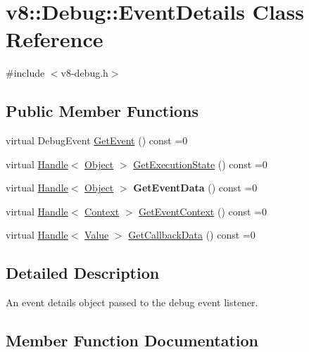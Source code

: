 \hypertarget{classv8_1_1_debug_1_1_event_details}{}\section{v8\+:\+:Debug\+:\+:Event\+Details Class Reference}
\label{classv8_1_1_debug_1_1_event_details}


{\ttfamily \#include $<$v8-\/debug.\+h$>$}

\subsection*{Public Member Functions}
\begin{DoxyCompactItemize}
\item 
virtual Debug\+Event \hyperlink{classv8_1_1_debug_1_1_event_details_ac871568e8cfd43bbf2cdac62add34ed0}{Get\+Event} () const =0
\item 
virtual \hyperlink{classv8_1_1_handle}{Handle}$<$ \hyperlink{classv8_1_1_object}{Object} $>$ \hyperlink{classv8_1_1_debug_1_1_event_details_abf0997988e1e3f0780c0d3f19b4e3b8a}{Get\+Execution\+State} () const =0
\item 
\hypertarget{classv8_1_1_debug_1_1_event_details_af8003f761cd535a07be5448a43d94c9f}{}virtual \hyperlink{classv8_1_1_handle}{Handle}$<$ \hyperlink{classv8_1_1_object}{Object} $>$ {\bfseries Get\+Event\+Data} () const =0\label{classv8_1_1_debug_1_1_event_details_af8003f761cd535a07be5448a43d94c9f}

\item 
virtual \hyperlink{classv8_1_1_handle}{Handle}$<$ \hyperlink{classv8_1_1_context}{Context} $>$ \hyperlink{classv8_1_1_debug_1_1_event_details_a2c98fc8b2848105c37fc60a04b35dfa5}{Get\+Event\+Context} () const =0
\item 
virtual \hyperlink{classv8_1_1_handle}{Handle}$<$ \hyperlink{classv8_1_1_value}{Value} $>$ \hyperlink{classv8_1_1_debug_1_1_event_details_a3c1eff8397db7c91e9c687f48d400665}{Get\+Callback\+Data} () const =0
\end{DoxyCompactItemize}


\subsection{Detailed Description}
An event details object passed to the debug event listener. 

\subsection{Member Function Documentation}
\hypertarget{classv8_1_1_debug_1_1_event_details_a3c1eff8397db7c91e9c687f48d400665}{}
